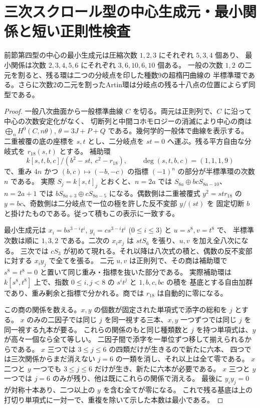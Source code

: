 \section{三次スクロール型の中心生成元・最小関係と短い正則性検査}
\label{sec:scroll-spin-center-generators}
\begin{theorem}\label{thm:scroll-spin-center-generators}
前節第四型の中心の最小生成元は圧縮次数 $1,2,3$ にそれぞれ $5,3,4$ 個あり、
最小関係は次数 $2,3,4,5,6$ にそれぞれ $3,6,10,6,10$ 個ある。
一般の次数 $1,2$ の二元を割ると、残る環は二つの分岐点を印した種数9の超楕円曲線の
半標準環である。さらに次数2の二元を割ったArtin環は分岐点の残る十八点の位置によらず同型である。
\end{theorem}
\begin{proof}
一般八次曲面から一般標準曲線 $C$ を切る。両元は正則列で、$C$ に沿って中心の次数安定化がなく、
切断列と中間コホモロジーの消滅により中心の商は $\bigoplus_n H^0(C,n\theta)$,
$\theta=3J+P+Q$ である。幾何学的一般体で曲線を表示する。
二重被覆の底の座標を $s,t$ とし、二分岐点を $st=0$ へ運ぶ。残る平方自由な分岐式を $r_{18}(s,t)$ とする。
補助環
\[
    k[s,t,b,c]/(b^2-st,\ c^2-r_{18}),\qquad
             \deg(s,t,b,c)=(1,1,1,9)
\]
で、重み $4n$ かつ $(b,c)\mapsto(-b,-c)$ の指標 $(-1)^n$ の部分が半標準環の次数 $n$ である。
実際 $S_j=k[s,t]_j$ とおくと、$n=2a$ では $S_{8a}\oplus bcS_{8a-10}$、
$n=2a+1$ では $bS_{8a+3}\oplus cS_{8a-5}$ になる。偶数側は二重被覆式
$y^2=st r_{18}$ の $y=bc$、奇数側は二分岐点で一位の極を許した反不変部 $y/(st)$ を
固定切断 $b$ と掛けたものである。従って積もこの表示に一致する。

最小生成元は $x_i=b s^{3-i}t^i$, $y_i=c s^{3-i}t^i$ ($0\le i\le3$) と $u=s^8,v=t^8$ で、
半標準次数は順に $1,3,2$ である。二次の $x_ix_j$ は $stS_6$ を張り、$u,v$ を加え全八次になる。
三次では $cS_3$ が初めて現れる。それ以降は八次式の積と、偶数の反不変部に対する $x_i y_j$ で全てを張る。
二元 $u,v$ は正則列で、その商は補助環で $s^8=t^8=0$ と置いて同じ重み・指標を抜いた部分である。
実際補助環は $k[s^8,t^8]$ 上で、指数 $0\le i,j<8$ の $s^it^j$ と $1,b,c,bc$ の積を
基底とする自由加群であり、重み剰余と指標で分かれる。商では $r_{18}$ は自動的に零になる。

この商の関係を数える。$x,y$ の個数が固定された単項式で添字の総和を $j$ とする。
$x$ のみの二因子では同じ $j$ を同一視する三本、$x,y$ 一つずつでは同じ $j$ を同一視する九本が要る。
これらの関係のもと同じ種類数と $j$ を持つ単項式は、$y$ が高々一個なら全て等しい。
二因子間で添字を一単位ずつ移して揃えられるからである。
$x$ 三つでは $3\le j\le6$ の四類だけが生きるので新たに六本、
四つでは三次関係からまだ消えない $j=6$ の一類を消し、それ以上は全て零である。
$x$ 二つと $y$ 一つでも $3\le j\le6$ だけが生き、新たに六本が必要である。
$x$ 三つと $y$ 一つでは $j=6$ のみが残り、他は既にこれらの関係で消える。
最後に $y_i y_j=0$ が対称十本あり、二つ以上の $y$ を含む全てが零になる。
これで残る基底は上の打切り単項式に一対一で、重複を除いて示した本数は最小である。


\end{proof}
